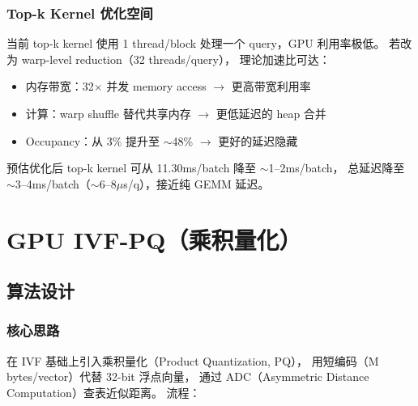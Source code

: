 \documentclass[UTF8,a4paper,10pt]{ctexart}
\begin{document}
\subsubsection{Top-k Kernel 优化空间}

当前 top-k kernel 使用 1 thread/block 处理一个 query，GPU 利用率极低。
若改为 warp-level reduction（32 threads/query），
理论加速比可达：
\begin{itemize}[itemsep=0pt]
\item 内存带宽：32$\times$ 并发 memory access $\to$ 更高带宽利用率
\item 计算：warp shuffle 替代共享内存 $\to$ 更低延迟的 heap 合并
\item Occupancy：从 3\% 提升至 $\sim$48\% $\to$ 更好的延迟隐藏
\end{itemize}

预估优化后 top-k kernel 可从 11.30ms/batch 降至 $\sim$1--2ms/batch，
总延迟降至 $\sim$3--4ms/batch（$\sim$6--8$\mu$s/q），接近纯 GEMM 延迟。

\section{GPU IVF-PQ（乘积量化）}
\label{sec:ivfpq}

\subsection{算法设计}

\subsubsection{核心思路}

在 IVF 基础上引入乘积量化（Product Quantization, PQ），
用短编码（M bytes/vector）代替 32-bit 浮点向量，
通过 ADC（Asymmetric Distance Computation）查表近似距离。
流程：
\end{document}

